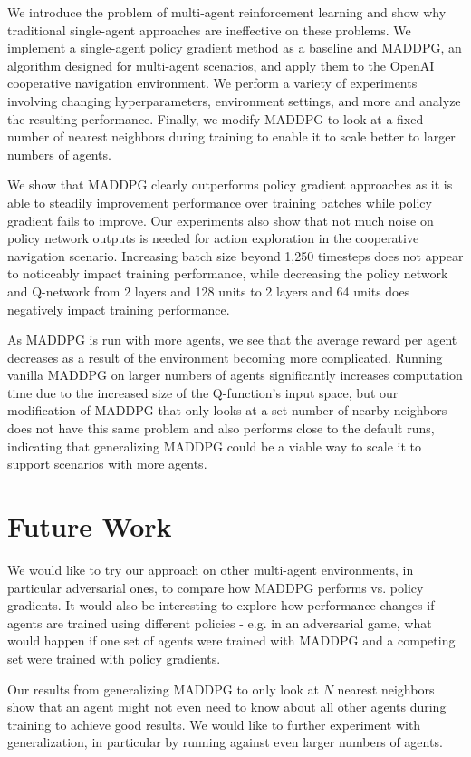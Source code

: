 \documentclass{article}
\begin{document}
We introduce the problem of multi-agent reinforcement learning and show why traditional single-agent approaches are ineffective on these problems. We implement a single-agent policy gradient method as a baseline and MADDPG, an algorithm designed for multi-agent scenarios, and apply them to the OpenAI cooperative navigation environment. We perform a variety of experiments involving changing hyperparameters, environment settings, and more and analyze the resulting performance. Finally, we modify MADDPG to look at a fixed number of nearest neighbors during training to enable it to scale better to larger numbers of agents.

We show that MADDPG clearly outperforms policy gradient approaches as it is able to steadily improvement performance over training batches while policy gradient fails to improve. Our experiments also show that not much noise on policy network outputs is needed for action exploration in the cooperative navigation scenario. Increasing batch size beyond 1,250 timesteps does not appear to noticeably impact training performance, while decreasing the policy network and Q-network from 2 layers and 128 units to 2 layers and 64 units does negatively impact training performance.

As MADDPG is run with more agents, we see that the average reward per agent decreases as a result of the environment becoming more complicated. Running vanilla MADDPG on larger numbers of agents significantly increases computation time due to the increased size of the Q-function's input space, but our modification of MADDPG that only looks at a set number of nearby neighbors does not have this same problem and also performs close to the default runs, indicating that generalizing MADDPG could be a viable way to scale it to support scenarios with more agents.


\section{Future Work}
We would like to try our approach on other multi-agent environments, in particular adversarial ones, to compare how MADDPG performs vs. policy gradients. It would also be interesting to explore how performance changes if agents are trained using different policies - e.g. in an adversarial game, what would happen if one set of agents were trained with MADDPG and a competing set were trained with policy gradients.

Our results from generalizing MADDPG to only look at $N$ nearest neighbors show that an agent might not even need to know about all other agents during training to achieve good results. We would like to further experiment with generalization, in particular by running against even larger numbers of agents.
\end{document}
